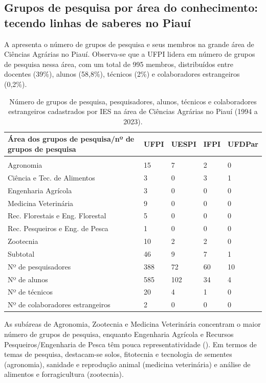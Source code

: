 \documentclass[portuguese]{textolivre}
\begin{document}
\subsection{Grupos de pesquisa por área do conhecimento: tecendo linhas de saberes no Piauí}\label{sec-organizacao}
A  apresenta o número de grupos de pesquisa e seus membros na grande área de Ciências Agrárias no Piauí. Observa-se que a UFPI lidera em número de grupos de pesquisa nessa área, com um total de 995 membros, distribuídos entre docentes (39\%), alunos (58,8\%), técnicos (2\%) e colaboradores estrangeiros (0,2\%).

\begin{table}[htbp]
\caption{Número de grupos de pesquisa, pesquisadores, alunos, técnicos e colaboradores estrangeiros cadastrados por IES na área de Ciências Agrárias no Piauí (1994 a 2023).}
\label{tbl4}
\centering
\begin{tabular}{>{\raggedright\arraybackslash}p{5cm} l l l l}
\toprule
Área dos grupos de pesquisa/nº de grupos de pesquisa & UFPI & UESPI & IFPI & UFDPar \\ 
\midrule
\multicolumn{5}{c}{Ciências Agrárias} \\
\midrule
Agronomia & 15 & 7 & 2 & 0 \\
Ciência e Tec. de Alimentos & 3 & 0 & 3 & 1 \\
Engenharia Agrícola & 3 & 0 & 0 & 0 \\
Medicina Veterinária & 9 & 0 & 0 & 0 \\
Rec. Florestais e Eng. Florestal & 5 & 0 & 0 & 0 \\
Rec. Pesqueiros e Eng. de Pesca & 1 & 0 & 0 & 0 \\
Zootecnia & 10 & 2 & 2 & 0 \\
\midrule
Subtotal & 46 & 9 & 7 & 1 \\
\midrule
Nº de pesquisadores & 388 & 72 & 60 & 10 \\
Nº de alunos & 585 & 102 & 34 & 4 \\
Nº de técnicos & 20 & 4 & 1 & 0 \\
Nº de colaboradores estrangeiros & 2 & 0 & 0 & 0 \\
\bottomrule
\end{tabular}
\end{table}

As subáreas de Agronomia, Zootecnia e Medicina Veterinária concentram o maior número de grupos de pesquisa, enquanto Engenharia Agrícola e Recursos Pesqueiros/Engenharia de Pesca têm pouca representatividade (). Em termos de temas de pesquisa, destacam-se solos, fitotecnia e tecnologia de sementes (agronomia), sanidade e reprodução animal (medicina veterinária) e análise de alimentos e forragicultura (zootecnia).
\end{document}
